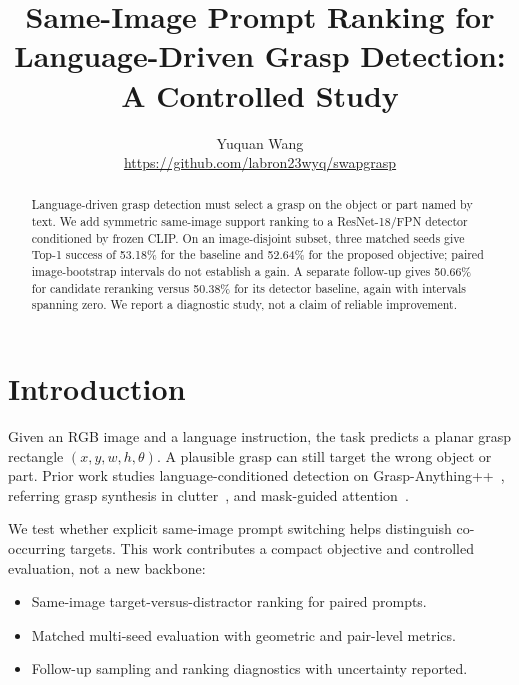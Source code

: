 \documentclass[10pt,twocolumn,letterpaper]{article}
\title{Same-Image Prompt Ranking for Language-Driven Grasp Detection: A Controlled Study}
\author{Yuquan Wang\\\url{https://github.com/labron23wyq/swapgrasp}}
\begin{document}
\maketitle
\begin{abstract}
Language-driven grasp detection must select a grasp on the object or part named by text. We add symmetric same-image support ranking to a ResNet-18/FPN detector conditioned by frozen CLIP. On an image-disjoint subset, three matched seeds give Top-1 success of 53.18\% for the baseline and 52.64\% for the proposed objective; paired image-bootstrap intervals do not establish a gain. A separate follow-up gives 50.66\% for candidate reranking versus 50.38\% for its detector baseline, again with intervals spanning zero. We report a diagnostic study, not a claim of reliable improvement.
\end{abstract}

\section{Introduction}
Given an RGB image and a language instruction, the task predicts a planar grasp rectangle $(x,y,w,h,\theta)$. A plausible grasp can still target the wrong object or part. Prior work studies language-conditioned detection on Grasp-Anything++~\cite{Vuong2024language}, referring grasp synthesis in clutter~\cite{Tziafas2023language}, and mask-guided attention~\cite{VanVo2024language}.

We test whether explicit same-image prompt switching helps distinguish co-occurring targets. This work contributes a compact objective and controlled evaluation, not a new backbone:
\begin{itemize}\setlength{\itemsep}{0pt}\setlength{\topsep}{2pt}
\item Same-image target-versus-distractor ranking for paired prompts.
\item Matched multi-seed evaluation with geometric and pair-level metrics.
\item Follow-up sampling and ranking diagnostics with uncertainty reported.
\end{itemize}
\end{document}
